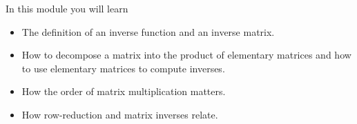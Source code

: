 \documentclass{problemset}
\begin{document}
\begin{module}

	In this module you will learn
	\begin{itemize}
		\item The definition of an inverse function and an inverse matrix.
		\item How to decompose a matrix into the product of elementary matrices and how to use
			elementary matrices to compute inverses.
		\item How the order of matrix multiplication matters.
		\item How row-reduction and matrix inverses relate.
	\end{itemize}

	
\end{module}
\end{document}
